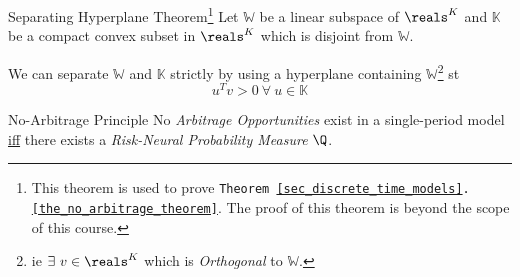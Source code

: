 \documentclass[11pt,a4paper]{article}
\begin{document}
  \begin{theorem}{Separating Hyperplane Theorem\footnote{This theorem is used to prove \texttt{Theorem \ref{sec_discrete_time_models}.\ref{the_no_arbitrage_theorem}}. The proof of this theorem is beyond the scope of this course.}}\label{the_separating_hyperplane_theorem}
    Let $\mathbb{W}$ be a linear subspace of $\reals^K$ and $\mathbb{K}$ be a compact convex subset in $\reals^K$ which is disjoint from $\mathbb{W}$.
    \par We can separate $\mathbb{W}$ and $\mathbb{K}$ strictly by using a hyperplane containing $\mathbb{W}$\footnote{ie $\exists\ v\in\reals^K$ which is \textit{Orthogonal} to $\mathbb{W}$.} st
    \[ u^Tv>0\ \forall\ u\in\mathbb{K} \]
  \end{theorem}

  \begin{theorem}{No-Arbitrage Principle}\label{the_no_arbitrage_theorem}
    No \textit{Arbitrage Opportunities} exist in a single-period model \underline{iff} there exists a \textit{Risk-Neural Probability Measure} $\Q$.
  \end{theorem}
\end{document}
